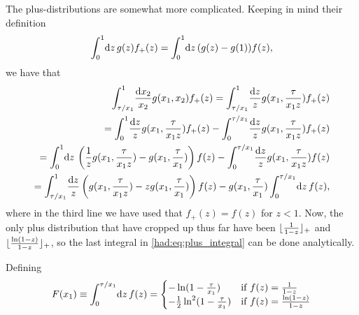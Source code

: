 \documentclass[../main.tex]{subfiles}
\begin{document}
The plus-distributions are somewhat more complicated.
Keeping in mind their definition
\begin{equation}
  \integral[_0^1]{z} g(z) f_+(z) = \integral[_0^1]{z} (g(z)-g(1)) f(z),
\end{equation}
we have that
\begin{align}
  \label{had:eq:plus_integral}
  \nonumber
  \int_{\tau/x_1}^1 \! \frac{\mathrm{d}x_2}{x_2} g(x_1, x_2) f_+(z) = \int_{\tau/x_1}^1 \! \frac{\mathrm{d}z}{z} g(x_1, \frac{\tau}{x_1z}) f_+(z)                                           \\
  \nonumber
  = \int_0^1 \! \frac{\mathrm{d}z}{z} g(x_1, \frac{\tau}{x_1 z}) f_+(z) - \int_0^{\tau/x_1} \! \frac{\mathrm{d}z}{z} g(x_1, \frac{\tau}{x_1 z}) f_+(z)                                      \\
  \nonumber
  = \int_0^1 \! \mathrm{d}z\, \pclosed{\frac{1}{z} g(x_1, \frac{\tau}{x_1 z}) - g(x_1, \frac{\tau}{x_1})} f(z) - \int_0^{\tau/x_1} \! \frac{\mathrm{d}z}{z} g(x_1, \frac{\tau}{x_1 z}) f(z) \\
  = \int_{\tau/x_1}^1 \! \frac{\mathrm{d}z}{z} \pclosed{g(x_1, \frac{\tau}{x_1 z}) - zg(x_1, \frac{\tau}{x_1})} f(z) - g(x_1, \frac{\tau}{x_1}) \integral[_0^{\tau/x_1}]{z} f(z),
\end{align}
where in the third line we have used that \(f_+(z) = f(z)\) for \(z < 1\).
Now, the only plus distribution that have cropped up thus far have been \(\plusdist{\frac{1}{1-z}}\) and \(\plusdist{\frac{\ln(1-z)}{1-z}}\), so the last integral in \cref{had:eq:plus_integral} can be done analytically.
\begin{temporary}
  Defining
  \begin{equation}
    F(x_1) \equiv \integral[_0^{\tau/x_1}]{z} f(z) = \begin{cases}
      -\ln(1-\frac{\tau}{x_1})              & \text{if } f(z) = \frac{1}{1-z}        \\
      -\frac{1}{2}\ln^2(1-\frac{\tau}{x_1}) & \text{if } f(z) = \frac{\ln(1-z)}{1-z}
    \end{cases}
  \end{equation}
\end{temporary}
\end{document}

